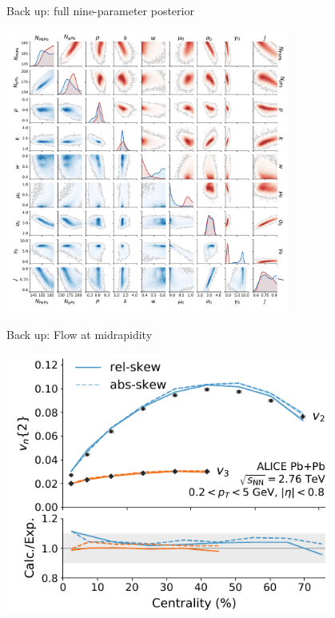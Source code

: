 \documentclass[11pt]{beamer}
\begin{document}
\begin{frame}[noframenumbering]{Back up: full nine-parameter posterior}
\begin{center}
\includegraphics[width=0.7\textwidth]{posterior.pdf}
\end{center}
\end{frame}

\begin{frame}[noframenumbering]{Back up: Flow at midrapidity}
\begin{center}
\includegraphics[width=0.8\textwidth]{vn_cen.pdf}
\end{center}
\end{frame}
\end{document}
